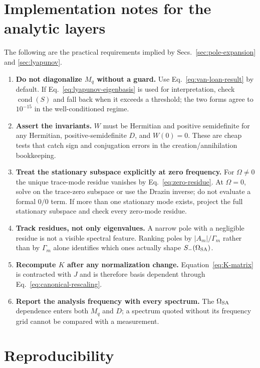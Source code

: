 \documentclass[11pt,a4paper]{article}
\begin{document}
\section{Implementation notes for the analytic layers}
\label{app:implementation}

The following are the practical requirements implied by
Secs.~\ref{sec:pole-expansion} and \ref{sec:lyapunov}.

\begin{enumerate}
\item \textbf{Do not diagonalize $M_q$ without a guard.} Use
Eq.~\eqref{eq:van-loan-result} by default. If
Eq.~\eqref{eq:lyapunov-eigenbasis} is used for interpretation, check
$\operatorname{cond}(S)$ and fall back when it exceeds a threshold; the two
forms agree to $10^{-15}$ in the well-conditioned regime.
\item \textbf{Assert the invariants.} $W$ must be Hermitian and positive
semidefinite for any Hermitian, positive-semidefinite $D$, and $W(0)=0$. These
are cheap tests that catch sign and conjugation errors in the
creation/annihilation bookkeeping.
\item \textbf{Treat the stationary subspace explicitly at zero frequency.}
For $\Omega\ne0$ the unique trace-mode residue vanishes by
Eq.~\eqref{eq:zero-residue}. At $\Omega=0$, solve on the trace-zero subspace or
use the Drazin inverse; do not evaluate a formal $0/0$ term. If more than one
stationary mode exists, project the full stationary subspace and check every
zero-mode residue.
\item \textbf{Track residues, not only eigenvalues.} A narrow pole with a
negligible residue is not a visible spectral feature. Ranking poles by
$|A_m|/\Gamma_m$ rather than by $\Gamma_m$ alone identifies which ones
actually shape $S_-(\Omega_{\rm SA})$.
\item \textbf{Recompute $K$ after any normalization change.}
Equation~\eqref{eq:K-matrix} is contracted with $J$ and is therefore
basis dependent through Eq.~\eqref{eq:canonical-rescaling}.
\item \textbf{Report the analysis frequency with every spectrum.} The
$\Omega_{\rm SA}$ dependence enters both $M_q$ and $D$; a spectrum quoted
without its frequency grid cannot be compared with a measurement.
\end{enumerate}

\section{Reproducibility}
\label{app:reproducibility}
\end{document}

